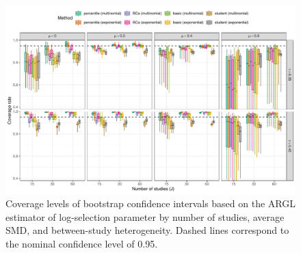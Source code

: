\documentclass[
  man, donotrepeattitle,floatsintext]{apa7}
\begin{document}
\begin{figure}
\includegraphics{selection_models_draft_files/figure-latex/ARGL-zeta-coverage-full-1} \caption{Coverage levels of bootstrap confidence intervals based on the ARGL estimator of log-selection parameter by number of studies, average SMD, and between-study heterogeneity. Dashed lines correspond to the nominal confidence level of 0.95.}\label{fig:ARGL-zeta-coverage-full}
\end{figure}
\end{document}
